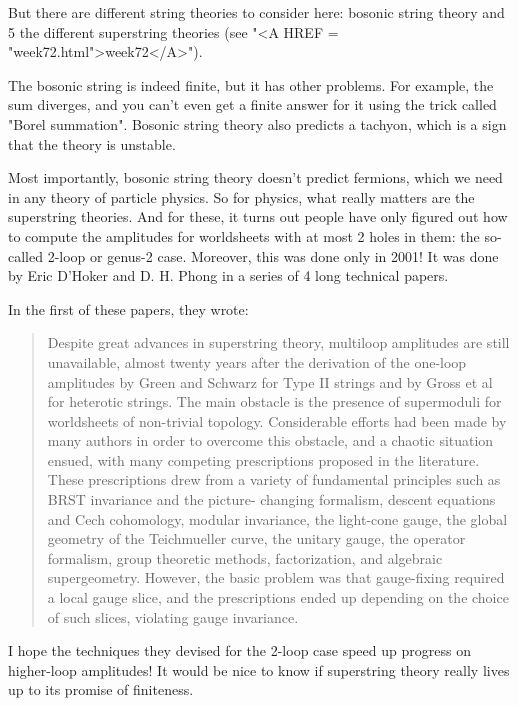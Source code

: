 But there are different string theories to consider here: bosonic 
string theory and 5 the different superstring theories (see "<A HREF = "week72.html">week72</A>").  


The bosonic string is indeed finite, but it has other
problems.  For example, the sum diverges, and you can't even get a
finite answer for it using the trick called "Borel
summation".  Bosonic string theory also predicts a tachyon, which
is a sign that the theory is unstable.

Most importantly, bosonic string theory doesn't predict fermions, which 
we need in any theory of particle physics.  So for physics, what really 
matters are the superstring theories.  And for these, it turns out people 
have only figured out how to compute the amplitudes for worldsheets with 
at most 2 holes in them: the so-called 2-loop or genus-2 case.  Moreover, 
this was done only in 2001!   It was done by Eric D'Hoker and D. H. Phong
in a series of 4 long technical papers.

In the first of these papers, they wrote:

\begin{quote}
 Despite great advances in superstring theory, multiloop 
 amplitudes are still unavailable, almost twenty years after the
 derivation of the one-loop amplitudes by Green and Schwarz
 for Type II strings and by Gross et al for heterotic strings.  
 The main obstacle is the presence of supermoduli for worldsheets
 of non-trivial topology.  Considerable efforts had been made by
 many authors in order to overcome this obstacle, and a chaotic
 situation ensued, with many competing prescriptions proposed in 
 the literature.  These prescriptions drew from a variety of 
 fundamental principles such as BRST invariance and the picture-
 changing formalism, descent equations and Cech cohomology, 
 modular invariance, the light-cone gauge, the global geometry
 of the Teichmueller curve, the unitary gauge, the operator
 formalism, group theoretic methods, factorization, and algebraic
 supergeometry.  However, the basic problem was that gauge-fixing
 required a local gauge slice, and the prescriptions ended up 
 depending on the choice of such slices, violating gauge invariance.
\end{quote}
    
I hope the techniques they devised for the 2-loop case speed up 
progress on higher-loop amplitudes!  It would be nice to know if 
superstring theory really lives up to its promise of finiteness.


